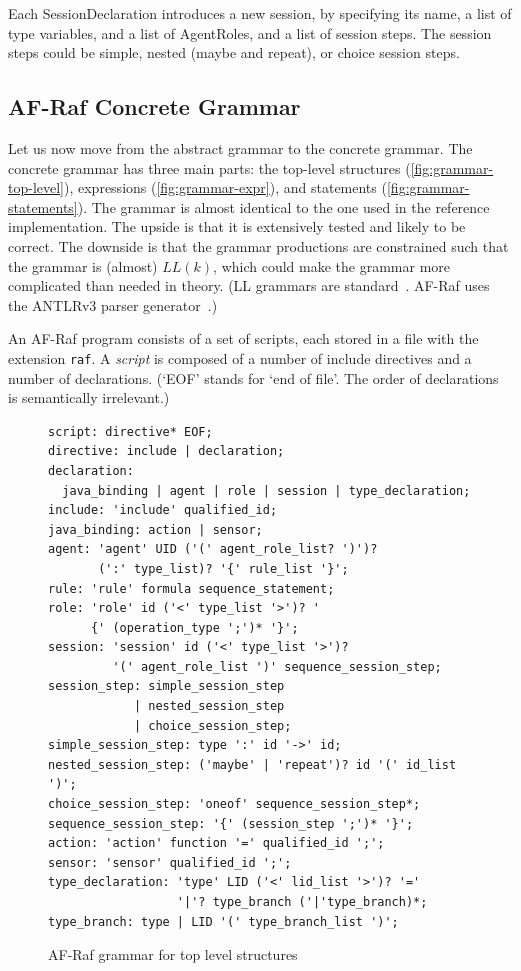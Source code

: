 \documentclass[a4paper,12pt,oneside,fleqn]{book} %
\newcommand{\todo}[1]{[\textcolor{red}{TODO}: #1]}
\begin{document}

Each SessionDeclaration introduces a new session, by specifying its name, a
list of type variables, and a list of AgentRoles, and a list of session
steps. The session steps could be simple, nested (maybe and repeat), or
choice session steps.

\subsection{AF-Raf Concrete Grammar} %
Let us now move from the abstract grammar to the concrete grammar.  The
concrete grammar has three main parts: the top-level structures
(\autoref{fig:grammar-top-level}), expressions
(\autoref{fig:grammar-expr}), and statements
(\autoref{fig:grammar-statements}). The grammar is almost identical to the
one used in the reference implementation. The upside is that it is
extensively tested and likely to be correct. The downside is that the
grammar productions are constrained such that the grammar is (almost)
$LL(k)$, which could make the grammar more complicated than needed in
theory.
(LL grammars are standard~\cite{rosenkrantz1970}.
AF-Raf uses the ANTLRv3 parser generator~\cite{DBLP:conf/pldi/ParrF11}.)

An AF-Raf program consists of a set of scripts, each stored in a file with
the extension {\tt raf}.  A {\it script\/} is composed of a number of
include directives and a number of declarations. (`EOF' stands for `end of
file'. The order of declarations is semantically irrelevant.)

\begin{figure}\footnotesize %
\begin{verbatim}
script: directive* EOF;
directive: include | declaration;
declaration:
  java_binding | agent | role | session | type_declaration;
include: 'include' qualified_id;
java_binding: action | sensor;
agent: 'agent' UID ('(' agent_role_list? ')')?
       (':' type_list)? '{' rule_list '}';
rule: 'rule' formula sequence_statement;
role: 'role' id ('<' type_list '>')? '
      {' (operation_type ';')* '}';
session: 'session' id ('<' type_list '>')?
         '(' agent_role_list ')' sequence_session_step;
session_step: simple_session_step
            | nested_session_step
            | choice_session_step;
simple_session_step: type ':' id '->' id;
nested_session_step: ('maybe' | 'repeat')? id '(' id_list ')';
choice_session_step: 'oneof' sequence_session_step*;
sequence_session_step: '{' (session_step ';')* '}';
action: 'action' function '=' qualified_id ';';
sensor: 'sensor' qualified_id ';';
type_declaration: 'type' LID ('<' lid_list '>')? '='
                  '|'? type_branch ('|'type_branch)*;
type_branch: type | LID '(' type_branch_list ')';
\end{verbatim}
\caption{AF-Raf grammar for top level structures}
\label{fig:grammar-top-level}
\end{figure} %
\end{document}
